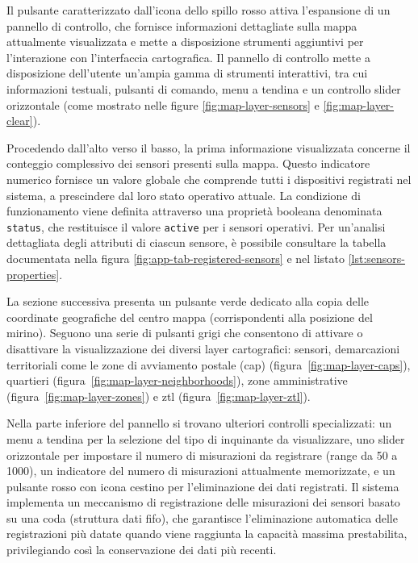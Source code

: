 Il pulsante caratterizzato dall'icona dello spillo rosso attiva l'espansione di un pannello di controllo,
che fornisce informazioni dettagliate sulla mappa attualmente visualizzata e mette a disposizione strumenti
aggiuntivi per l'interazione con l'interfaccia cartografica.
Il pannello di controllo mette a disposizione dell'utente un'ampia gamma di strumenti interattivi, tra cui
informazioni testuali, pulsanti di comando, menu a tendina e un controllo slider orizzontale
(come mostrato nelle figure \ref{fig:map-layer-sensors} e \ref{fig:map-layer-clear}).

Procedendo dall'alto verso il basso, la prima informazione visualizzata concerne il conteggio complessivo
dei sensori presenti sulla mappa. Questo indicatore numerico fornisce un valore globale che comprende tutti
i dispositivi registrati nel sistema, a prescindere dal loro stato operativo attuale. La condizione di funzionamento
viene definita attraverso una proprietà booleana denominata \texttt{status}, che restituisce il valore \texttt{active}
per i sensori operativi. Per un'analisi dettagliata degli attributi di ciascun sensore, è possibile consultare
la tabella documentata nella figura \ref{fig:app-tab-registered-sensors} e nel listato \ref{lst:sensors-properties}.

La sezione successiva presenta un pulsante verde dedicato alla copia delle coordinate geografiche del centro mappa
(corrispondenti alla posizione del mirino). Seguono una serie di pulsanti grigi che consentono
di attivare o disattivare la visualizzazione dei diversi layer cartografici: sensori, demarcazioni territoriali
come le zone di avviamento postale (\acrshort{cap}) (figura~\ref{fig:map-layer-caps}),
quartieri (figura~\ref{fig:map-layer-neighborhoods}),
zone amministrative (figura~\ref{fig:map-layer-zones}) e \acrshort{ztl} (figura~\ref{fig:map-layer-ztl}).

Nella parte inferiore del pannello si trovano ulteriori controlli specializzati: un menu a tendina per la selezione
del tipo di inquinante da visualizzare, uno slider orizzontale per impostare il numero di misurazioni
da registrare (range da 50 a 1000), un indicatore del numero di misurazioni attualmente memorizzate, e un pulsante
rosso con icona cestino per l'eliminazione dei dati registrati. Il sistema implementa un meccanismo di registrazione
delle misurazioni dei sensori basato su una coda (struttura dati \acrshort{fifo}), che garantisce
l'eliminazione automatica delle registrazioni più datate quando viene raggiunta la capacità massima prestabilita,
privilegiando così la conservazione dei dati più recenti.

